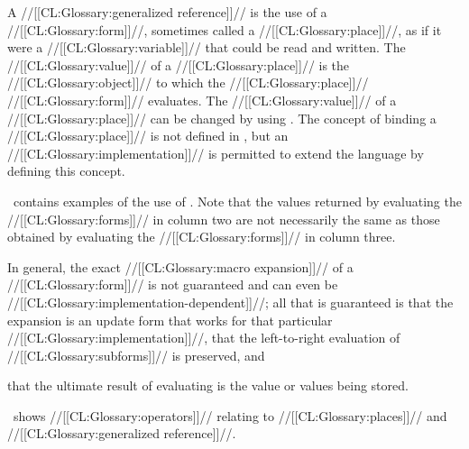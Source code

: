 






A //[[CL:Glossary:generalized reference]]// is the use of a //[[CL:Glossary:form]]//,
sometimes called a //[[CL:Glossary:place]]//,
as if it were a //[[CL:Glossary:variable]]// that could be read and written.
The //[[CL:Glossary:value]]// of a //[[CL:Glossary:place]]// is 
the //[[CL:Glossary:object]]// to which the //[[CL:Glossary:place]]// //[[CL:Glossary:form]]// evaluates.
The //[[CL:Glossary:value]]// of a //[[CL:Glossary:place]]// can be changed by using .
The concept of binding a //[[CL:Glossary:place]]// is not defined in \clisp,
but an //[[CL:Glossary:implementation]]// is permitted to extend the language by defining this concept.

\Thenextfigure\ contains examples of the use of .
Note that the values returned by evaluating the //[[CL:Glossary:forms]]// in column two 
are not necessarily the same as those obtained by evaluating the 
//[[CL:Glossary:forms]]// in column three.

In general, the exact //[[CL:Glossary:macro expansion]]// of a  //[[CL:Glossary:form]]// is not guaranteed 
and can even be //[[CL:Glossary:implementation-dependent]]//;
all that is guaranteed is 
 that the expansion is an update form that works
   for that particular //[[CL:Glossary:implementation]]//,
 that the left-to-right evaluation of //[[CL:Glossary:subforms]]// is preserved, 
and

 that the ultimate result of evaluating  is the value
  or values being stored.


\Thenextfigure\ shows //[[CL:Glossary:operators]]// relating to
//[[CL:Glossary:places]]// and //[[CL:Glossary:generalized reference]]//.






